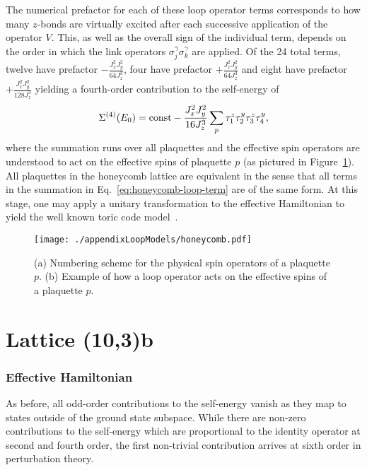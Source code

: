 The numerical prefactor for each of these loop operator terms corresponds to how many $z$-bonds are virtually excited after each successive application of the operator $V$.
This, as well as the overall sign of the individual term, depends on the order in which the link operators $\sigma_j^\gamma \sigma_k^\gamma$ are applied.
Of the 24 total terms, twelve have prefactor $-\frac{J_x^2 J_y^2}{64 J_z^3}$, four have prefactor $+\frac{J_x^2 J_y^2}{64 J_z^3}$ and eight have prefactor $+\frac{J_x^2 J_y^2}{128 J_z^3}$ yielding a fourth-order contribution to the self-energy of
%
\begin{equation}
	\Sigma^{(4)}(E_0) = {\rm const} - \frac{J_x^2 J_y^2}{16 J_z^3} \sum_{p} \tau_1^z \tau_2^y \tau_3^z \tau_4^y,
	\label{eq:honeycomb-loop-term}
\end{equation}
%
where the summation runs over all plaquettes and the effective spin operators are understood to act on the effective spins of plaquette $p$ (as pictured in Figure~\ref{fig:appendix1_Honeycomb}).
All plaquettes in the honeycomb lattice are equivalent in the sense that all terms in the summation in Eq.~\eqref{eq:honeycomb-loop-term} are of the same form.
At this stage, one may apply a unitary transformation to the effective Hamiltonian to yield the well known toric code model~\cite{KitaevAoP2003,KitaevAoP2006}.
%
\begin{figure}[tb]
	\centering
	\texttt{[image: ./appendixLoopModels/honeycomb.pdf]}
	\caption{(a) Numbering scheme for the physical spin operators of a plaquette $p$. (b) Example of how a loop operator acts on the effective spins of a plaquette $p$.}
	\label{fig:appendix1_Honeycomb}
\end{figure}
%


%
%
\section{Lattice (10,3)b}
\label{appendix:LoopModels_10_3b}
%
%
\subsubsection{Effective Hamiltonian}
%
%
As before, all odd-order contributions to the self-energy vanish as they map to states outside of the ground state subspace.
While there are non-zero contributions to the self-energy which are proportional to the identity operator at second and fourth order, the first non-trivial contribution arrives at sixth order in perturbation theory.

